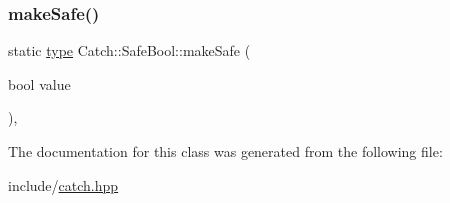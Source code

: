 \subsubsection{\texorpdfstring{make\+Safe()}{makeSafe()}}
{\footnotesize\ttfamily static \mbox{\hyperlink{class_catch_1_1_safe_bool_a39eef9baed296299d625a54d54a2a958}{type}} Catch\+::\+Safe\+Bool\+::make\+Safe (\begin{DoxyParamCaption}\item[{bool}]{value }\end{DoxyParamCaption})\hspace{0.3cm}{\ttfamily [inline]}, {\ttfamily [static]}}



The documentation for this class was generated from the following file\+:\begin{DoxyCompactItemize}
\item 
include/\mbox{\hyperlink{catch_8hpp}{catch.\+hpp}}\end{DoxyCompactItemize}
